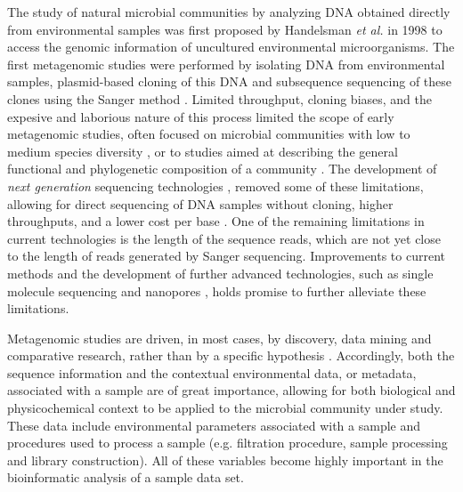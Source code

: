     The study of natural microbial communities by analyzing DNA obtained directly from environmental samples was first proposed by Handelsman \textit{et al.} in 1998 \cite{Handelsman:1998tx} to access the genomic information of uncultured environmental microorganisms. The first metagenomic studies were performed by isolating DNA from environmental samples, plasmid-based cloning of this DNA and subsequence sequencing of these clones using the Sanger method \cite{Tyson:2004bw,Venter:2004hg}. Limited throughput, cloning biases, and the expesive and laborious nature of this process limited the scope of early metagenomic studies, often focused on microbial communities with low to medium species diversity \cite{Tyson:2004bw,Podell:2013kx}, or to studies aimed at describing the general functional and phylogenetic composition of a community  \cite{Venter:2004hg,Rusch:2007ez}. The development of \textit{next generation} sequencing technologies \cite{Mardis:2013gn}, removed some of these limitations, allowing for direct sequencing of DNA samples without cloning,  higher throughputs, and a lower cost per base \cite{Mardis:2013gn}. One of the remaining limitations in current technologies is the length of the sequence reads, which are not yet close to the length of reads generated by Sanger sequencing. Improvements to current methods and the development of further advanced technologies, such as single molecule sequencing \cite{Eid:2009kv} and nanopores \cite{Branton:2008fr}, holds promise to further alleviate these limitations.

Metagenomic studies are driven, in most cases, by discovery, data mining and comparative research, rather than by a specific hypothesis \cite{Wooley:2010uv}. Accordingly, both the sequence information and the contextual environmental data, or metadata, associated with a sample are of great importance, allowing for both biological and physicochemical context to be applied to the microbial community under study. These data include environmental parameters associated with a sample and procedures used to process a sample (e.g. filtration procedure, sample processing and library construction). All of these variables become highly important in the bioinformatic analysis of a sample data set\cite{Narasingarao:2012kp}.

